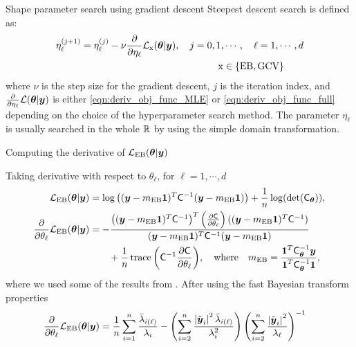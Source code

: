 \documentclass[handout, 10pt,compress,xcolor={usenames,dvipsnames}]{beamer} %
\newcommand{\bm}[1]{\boldsymbol{#1}}
\newcommand{\smallcite}[1]{{\small\cite{#1}}}
\newcommand{\MLE}{\textup{EB}}
\newcommand{\GCV}{\textup{GCV}}
\newcommand{\mCInv}{\mC^{-1}}
\renewcommand{\vtheta}{{\bm{\theta}}}
\newcommand{\mCthetaInv}{{\mathsf{C}^{-1}_{\vtheta}}}
\def\abs#1{\ensuremath{\left \lvert #1 \right \rvert}}
\begin{document}
\begin{frame}{Shape parameter search using gradient descent}
Steepest descent search is defined as:
\begin{align*}
\eta^{(j+1)}_\ell &= \eta^{(j)}_\ell - \nu \frac{\partial}{\partial \eta_\ell} \mathcal{L}_{\bm{\textup{x}}}(\vtheta | \vy), \quad j=0,1,\cdots, \quad \ell = 1, \cdots, d \\
& \hspace{5cm} \bm{\textup{x}} \in \{\MLE, \GCV\}
\end{align*}
where $\nu$ is the step size for the gradient descent, $j$ is the iteration index, and $\frac{\partial}{\partial \eta_\ell} \mathcal{L}(\vtheta | \vy)$ is either \eqref{eqn:deriv_obj_func_MLE} or \eqref{eqn:deriv_obj_func_full} depending on the choice of the hyperparameter search method. The parameter $\eta_\ell$ is usually searched in the whole $\mathbb{R}$ by using the simple domain transformation.
\end{frame}








\begin{frame}{Computing the derivative of $\mathcal{L}_{\MLE}(\vtheta | \vy)$}

Taking derivative with respect to $\theta_\ell$, for $\ell=1,\cdots,d$
\begin{align*}
\mathcal{L}_{\MLE}(\vtheta | \vy)
& = \log\left( {(\vy-m_\MLE\vone)^T\mCInv(\vy-m_\MLE\vone)} \right) + \frac{1}{n} \log(\det(\mC_\vtheta)),
\\
\frac{\partial}{\partial \theta_\ell} \mathcal{L}_{\MLE}(\vtheta | \vy)
& = - \frac
{\left((\vy-m_\MLE\vone)^T\mCInv\right)^T 
	\left( \frac{\partial \mC}{\partial \theta_\ell} \right)
	((\vy-m_\MLE\vone)^T\mCInv)}
{(\vy-m_\MLE\vone)^T\mCInv(\vy-m_\MLE\vone)}
\\ & \qquad
+ \frac 1n \trace{\left( \mCInv \frac{\partial \mC}{\partial \theta_\ell} \right)}
, \quad \text{where} \quad m_\MLE = \frac{\vone^T \mCthetaInv \vy }{ \vone^T \mCthetaInv \vone}, 
\end{align*}
where we used some of the results from \smallcite{Dong2017a}.  After using the fast Bayesian transform properties
	\begin{align}
	\label{eqn:deriv_obj_func_MLE}
	\frac{\partial}{\partial \theta_\ell} \mathcal{L}_{\MLE}(\vtheta | \vy)
	&=  \frac 1n \sum_{i=1}^{n} \frac{\bar{\lambda}_{i(\ell)}}{\lambda_i}
	- \left({ \sum_{i=2}^n \frac{\abs{\tvy_i}^2 \bar{\lambda}_{i(\ell)}}{\lambda_i^2}}\right)
	\left( {\sum_{i=2}^n \frac{\abs{\tvy_i}^2}{\lambda_\ell}} \right)^{-1}
	\end{align}
              
\end{frame}
\end{document}

